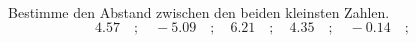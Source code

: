 \begin{aufgabe} ~ \\ 
Bestimme den Abstand zwischen den beiden kleinsten Zahlen.\[4.57\quad ; \quad-5.09\quad ; \quad6.21\quad ; \quad4.35\quad ; \quad-0.14\quad ; \quad\]\underline{\hspace{12cm}}\end{aufgabe} 
